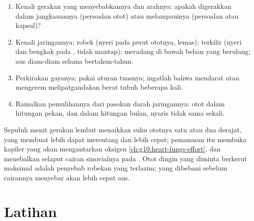 \begin{method}\label{met:g10:muscles-and-joints:analyse}
\begin{enumerate}
  \item Kenali gerakan yang menyebabkannya dan arahnya: apakah 
        digerakkan dalam jangkauannya (persoalan otot) atau melampauinya
        (persoalan  atau kapsul)?
  \item Kenali jaringannya:  robek (nyeri pada perut ototnya,
        lemas);  terkilir (nyeri dan bengkak pada , tidak
        mantap);  meradang di bawah beban yang berulang;  aus diam-diam selama bertahun-tahun.
  \item Perkirakan gayanya: pakai aturan tuasnya; ingatlah bahwa
        mendarat atau mengerem melipatgandakan berat tubuh beberapa kali.
  \item Ramalkan pemulihannya dari pasokan darah jaringannya: otot
        dalam hitungan pekan,  dan  dalam hitungan bulan,
         nyaris tidak sama sekali.
\end{enumerate}
\end{method}

\begin{remark}\label{rem:g10:muscles-and-joints:warmup}
Sepuluh menit gerakan lembut menaikkan suhu ototnya satu atau dua
derajat, yang membuat  lebih dapat merentang dan 
lebih cepat; pemanasan itu membuka kapiler yang akan mengantarkan
oksigen \cref{ch:g10:heart-lungs-effort}, dan menebalkan selaput cairan
sinovialnya pada . Otot dingin yang diminta berkerut
maksimal adalah penyebab robekan yang terlazim;  yang dibebani
sebelum cairannya menyebar akan lebih cepat aus.
\end{remark}

\section{Latihan}


